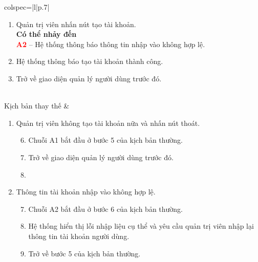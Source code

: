 \begin{longtblr}[caption = {Đặc tả usecase Tạo tài khoản người dùng},
  label = {tab:usecase6-spec},]{colspec={|l|p{.7\linewidth}|}}
\begin{minipage}{\linewidth}
\begin{enumerate}
            \textbf{\textcolor{red}{A1}} -- Quản trị viên không tạo tài khoản nữa và nhấn nút thoát.
      \item Quản trị viên nhấn nút tạo tài khoản.\\
            \textbf{Có thể nhảy đến}\\
            \textbf{\textcolor{red}{A2}} -- Hệ thống thông báo thông tin nhập vào không hợp lệ.
      \item Hệ thống thông báo tạo tài khoản thành công.
      \item Trở về giao diện quản lý người dùng trước đó.
    \end{enumerate}
    \vskip 1pt
  \end{minipage}
  \\\hline
  Kịch bản thay thế    &
  \begin{minipage}{\linewidth}
    \vskip 4pt
    \begin{enumerate}[label={\textbf{\textcolor{red}{A\arabic*}} --}, align=left, itemsep=-5pt]
      \item  Quản trị viên không tạo tài khoản nữa và nhấn nút thoát.  \\
            \vspace{-1.5em}
            \begin{enumerate}[leftmargin=-5px, align=left, label=\arabic*.]
              \setcounter{enumii}{5}
              \item[]
                    \hspace{-25px} Chuỗi A1 bắt đầu ở bước 5 của kịch bản thường.
              \item Trở về giao diện quản lý người dùng trước đó.
              \item[]
            \end{enumerate}
      \item Thông tin tài khoản nhập vào không hợp lệ. \\
            \vspace{-1.5em}
            \begin{enumerate}[leftmargin=-5px, align=left, label=\arabic*.]
              \setcounter{enumii}{6}
              \item[]
                    \hspace{-25px} Chuỗi A2 bắt đầu ở bước 6 của kịch bản thường.
              \item Hệ thống hiển thị lỗi nhập liệu cụ thể và yêu cầu quản trị viên nhập lại thông tin tài khoản người dùng.
              \item Trở về bước 5 của kịch bản thường.

\end{enumerate}
\end{enumerate}
\end{minipage}
\end{longtblr}

